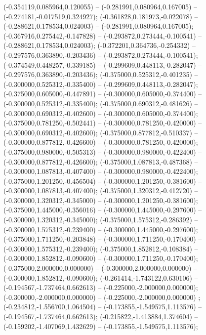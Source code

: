  (-0.354119,0.085964,0.120055) -- (-0.281991,0.080964,0.167005) -- (-0.274181,-0.017519,0.324927);
 (-0.361828,0.181973,-0.022078) -- (-0.288621,0.178534,0.024003) -- (-0.281991,0.080964,0.167005);
 (-0.367916,0.275442,-0.147828) -- (-0.293872,0.273444,-0.100541) -- (-0.288621,0.178534,0.024003);
 (-0.372201,0.364736,-0.254332) -- (-0.297576,0.363890,-0.203436) -- (-0.293872,0.273444,-0.100541);
 (-0.374549,0.448257,-0.339185) -- (-0.299609,0.448113,-0.282047) -- (-0.297576,0.363890,-0.203436);
 (-0.375000,0.525312,-0.401235) -- (-0.300000,0.525312,-0.335400) -- (-0.299609,0.448113,-0.282047);
 (-0.375000,0.605000,-0.447891) -- (-0.300000,0.605000,-0.374400) -- (-0.300000,0.525312,-0.335400);
 (-0.375000,0.690312,-0.481626) -- (-0.300000,0.690312,-0.402600) -- (-0.300000,0.605000,-0.374400);
 (-0.375000,0.781250,-0.502441) -- (-0.300000,0.781250,-0.420000) -- (-0.300000,0.690312,-0.402600);
 (-0.375000,0.877812,-0.510337) -- (-0.300000,0.877812,-0.426600) -- (-0.300000,0.781250,-0.420000);
 (-0.375000,0.980000,-0.505313) -- (-0.300000,0.980000,-0.422400) -- (-0.300000,0.877812,-0.426600);
 (-0.375000,1.087813,-0.487368) -- (-0.300000,1.087813,-0.407400) -- (-0.300000,0.980000,-0.422400);
 (-0.375000,1.201250,-0.456504) -- (-0.300000,1.201250,-0.381600) -- (-0.300000,1.087813,-0.407400);
 (-0.375000,1.320312,-0.412720) -- (-0.300000,1.320312,-0.345000) -- (-0.300000,1.201250,-0.381600);
 (-0.375000,1.445000,-0.356016) -- (-0.300000,1.445000,-0.297600) -- (-0.300000,1.320312,-0.345000);
 (-0.375000,1.575312,-0.286392) -- (-0.300000,1.575312,-0.239400) -- (-0.300000,1.445000,-0.297600);
 (-0.375000,1.711250,-0.203848) -- (-0.300000,1.711250,-0.170400) -- (-0.300000,1.575312,-0.239400);
 (-0.375000,1.852812,-0.108384) -- (-0.300000,1.852812,-0.090600) -- (-0.300000,1.711250,-0.170400);
 (-0.375000,2.000000,0.000000) -- (-0.300000,2.000000,0.000000) -- (-0.300000,1.852812,-0.090600);
 (-0.261414,-1.743122,0.630106) -- (-0.194567,-1.737464,0.662613) -- (-0.225000,-2.000000,0.000000);
 (-0.300000,-2.000000,0.000000) -- (-0.225000,-2.000000,0.000000) ;
 (-0.234812,-1.556700,1.064504) -- (-0.173855,-1.549575,1.113576) -- (-0.194567,-1.737464,0.662613);
 (-0.215822,-1.413884,1.374604) -- (-0.159202,-1.407069,1.432629) -- (-0.173855,-1.549575,1.113576);
